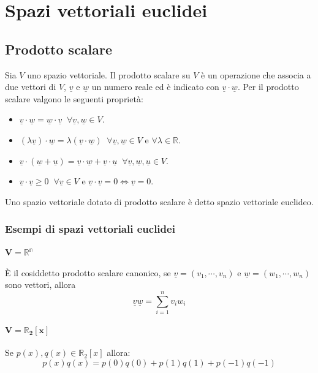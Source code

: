 \chapter{Spazi vettoriali euclidei}
\section{Prodotto scalare}
Sia $V$ uno spazio vettoriale. Il prodotto scalare su $V$ \`e un operazione che associa a due vettori di $V$, $\underline{v}$ e $\underline{w}$ un numero reale ed \`e indicato con
$\underline{v}\cdot\underline{w}$. Per il prodotto scalare valgono le seguenti propriet\`a:
\begin{itemize}
\item $\underline{v}\cdot\underline{w}=\underline{w}\cdot\underline{v}\;\;\forall\underline{v},\underline{w}\in V$.
\item $(\lambda\underline{v})\cdot\underline{w}=\lambda(\underline{v}\cdot\underline{w})\;\;\forall\underline{v},\underline{w}\in V$ e $\forall\lambda\in\mathbb{R}$.
\item $\underline{v}\cdot(\underline{w}+\underline{u})=\underline{v}\cdot\underline{w}+\underline{v}\cdot\underline{u}\;\;\forall\underline{v},\underline{w}, \underline{u}\in V$.
\item $\underline{v}\cdot\underline{v}\ge0\;\;\forall\underline{v}\in V$ e $\underline{v}\cdot\underline{v}=0\Leftrightarrow\underline{v}=0$.
\end{itemize}
Uno spazio vettoriale dotato di prodotto scalare \`e detto spazio vettoriale euclideo.
\subsection{Esempi di spazi vettoriali euclidei}
\subsubsection{$\mathbf{V=\mathbb{R^n}}$}
\`E il cosiddetto prodotto scalare canonico, se $\underline{v}=(v_1,\cdots,v_n)$ e $\underline{w}=(w_1,\cdots,w_n)$ sono vettori, allora
\begin{equation}
\underline{v}\underline{w}=\sum\limits_{i=1}^nv_iw_i
\end{equation}
\subsubsection{$\mathbf{V=\mathbb{R}_2[x]}$}
Se $p(x), q(x)\in\mathbb{R}_2[x]$ allora:
\begin{equation}
p(x)q(x)=p(0)q(0)+p(1)q(1)+p(-1)q(-1)
\end{equation}
